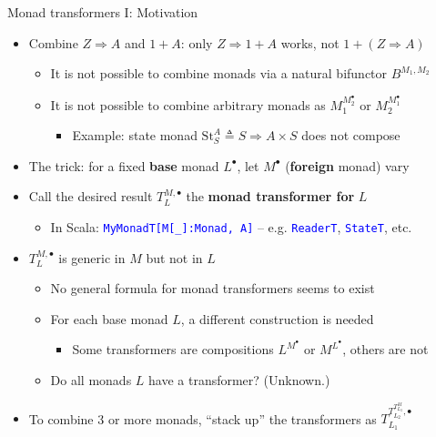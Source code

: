 \documentclass[english]{beamer}
\begin{document}
\begin{frame}{Monad transformers I: Motivation}

\begin{itemize}
\item {\footnotesize{}\vspace{-0.2cm}}Combine $Z\Rightarrow A$ and $1+A$:
only $Z\Rightarrow1+A$ works, not $1+\left(Z\Rightarrow A\right)$
\begin{itemize}
\item It is not possible to combine monads via a natural bifunctor $B^{M_{1},M_{2}}$
\item It is not possible to combine arbitrary monads as $M_{1}^{M_{2}^{\bullet}}$
or $M_{2}^{M_{1}^{\bullet}}$
\begin{itemize}
\item Example: state monad $\text{St}_{S}^{A}\triangleq S\Rightarrow A\times S$
does not compose
\end{itemize}
\end{itemize}
\item The trick: for a fixed \textbf{base }monad $L^{\bullet}$, let $M^{\bullet}$
(\textbf{foreign }monad) vary
\item Call the desired result $T_{L}^{M,\bullet}$ the \textbf{monad transformer
for} $L$
\begin{itemize}
\item In Scala: \texttt{\textcolor{blue}{\footnotesize{}MyMonadT{[}M{[}\_{]}:Monad,
A{]}}} -- e.g. \texttt{\textcolor{blue}{\footnotesize{}ReaderT}},
\texttt{\textcolor{blue}{\footnotesize{}StateT}}, etc.
\end{itemize}
\item $T_{L}^{M,\bullet}$ is generic in $M$ but not in $L$
\begin{itemize}
\item No general formula for monad transformers seems to exist
\item For each base monad $L$, a different construction is needed
\begin{itemize}
\item Some transformers are compositions $L^{M^{\bullet}}$ or $M^{L^{\bullet}}$,
others are not
\end{itemize}
\item Do all monads $L$ have a transformer? (Unknown.)
\end{itemize}
\item {\footnotesize{}\vspace{-0.3cm}}To combine 3 or more monads, ``stack
up'' the transformers as $T_{L_{1}}^{T_{L_{2}}^{T_{L_{3}}^{M}},\bullet}$

\end{itemize}
\end{frame}
\end{document}
